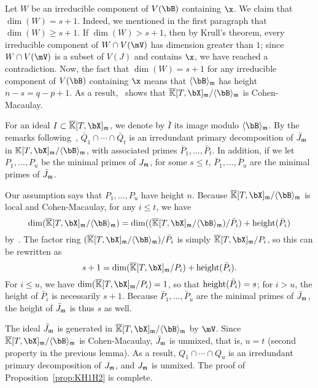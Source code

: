 \documentclass[12pt]{article}
\begin{document}
Let $W$ be an irreducible component of $V(\bB)$ containing $\x$.  We
claim that $\dim(W)=s+1$. Indeed, we mentioned in the first paragraph
that $\dim(W) \ge s+1$. If $\dim(W) > s+1$, then by Krull's theorem,
every irreducible component of $W \cap V(\mV)$ has dimension greater
than $1$; since $W \cap V(\mV)$ is a subset of $V(J)$ and contains $\x$,
we have reached a contradiction. Now, the fact that $\dim(W)=s+1$ for
any irreducible component of $V(\bB)$ containing $\x$ means that
$\langle \bB \rangle_\m$ has height $n-s=q-p+1$.  As a
result,~\cite[Theorem~18.18]{Eisenbud95} shows that
$\KKbar[T,\bX]_\m/\langle \bB \rangle_\m$ is Cohen-Macaulay.

For an ideal $I \subset \KKbar[T,\bX]_\m$, we denote by $\bar I$ its
image modulo $\langle \bB \rangle_\m$.  By the remarks
following~\cite[Theorem~IV.5.9]{ZaSa58},
$\bar Q_1 \cap \cdots \cap \bar Q_t$ is an irredundant primary
decomposition of $\bar J_{\mathfrak{m}}$ in
$\KK[T,\bX]_\m/\langle \bB \rangle_\m$, with associated primes
$\bar P_1,\dots,\bar P_t$. In addition, if we let $P_1,\dots,P_u$ be
the minimal primes of $J_{\mathfrak{m}}$, for some $s \le t$,
$\bar P_1,\dots,\bar P_u$ are the minimal primes of $\bar J_{\mathfrak{m}}$.

Our assumption says that $P_1,\dots,P_u$ have height $n$. Because
$\KKbar[T,\bX]_\m/\langle \bB \rangle_\m$ is local and Cohen-Macaulay, for any
$i \le t$, we have 
$$\dim(\KKbar[T,\bX]_\m/\langle \bB \rangle_\m)=\dim((\KKbar[T,\bX]_\m/\langle \bB \rangle_\m) / \bar P_i) + {\rm height}(\bar P_i)$$
by~\cite[Theorem~17.4(i)]{Matsumura86}.
The factor ring $(\KKbar[T,\bX]_\m/\langle \bB \rangle_\m) / \bar P_i$ is simply
$\KKbar[T,\bX]_\m/P_i$, so this can be rewritten as
$$s+1 = \dim(\KKbar[T,\bX]_\m/P_i) + {\rm height}(\bar P_i).$$ For $i\le
u$, we have $\dim(\KKbar[T,\bX]_\m/P_i)=1$, so that ${\rm height}(\bar
P_i)=s$; for $i > u$, the height of $\bar P_i$ is necessarily
$s+1$. Because $\bar P_1,\dots,\bar P_u$ are the minimal primes of
$\bar J_{\mathfrak{m}}$, the height of $\bar J_{\mathfrak{m}}$ is thus $s$ as well.

The ideal $\bar J_{\mathfrak{m}}$ is generated in $\KKbar[T,\bX]_\m/\langle \bB
\rangle_\m$ by $\mV$. Since $\KKbar[T,\bX]_\m/\langle
\bB \rangle_\m$ is Cohen-Macaulay, $\bar J_{\mathfrak{m}}$ is unmixed, that is,
$u=t$ (second property in the previous lemma).  As a result, $Q_1 \cap
\cdots \cap Q_u$ is an irredundant primary decomposition of $J_{\mathfrak{m}}$,
and $J_{\mathfrak{m}}$ is unmixed. The proof of Proposition~\ref{prop:KH1H2} is complete.

\end{document}
